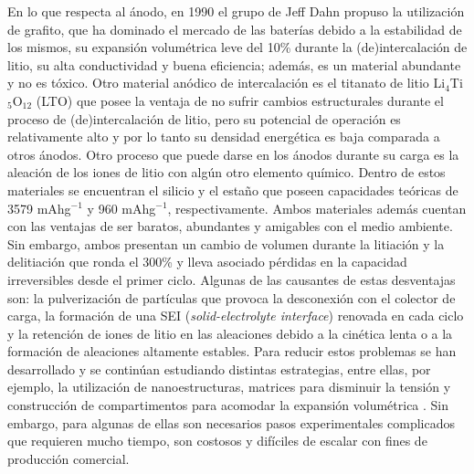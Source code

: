 En lo que respecta al ánodo, en 1990 el grupo de Jeff Dahn \cite{fong1990} propuso 
la utilización de grafito, que ha dominado el mercado de las baterías debido a
la estabilidad de los mismos, su expansión volumétrica leve del 10\% durante 
la (de)intercalación de litio, su alta conductividad y buena eficiencia; además, 
es un material abundante y no es tóxico. Otro material anódico de intercalación 
es el titanato de litio Li$_4$Ti$_5$O$_{12}$ (LTO) que posee la ventaja de 
no sufrir cambios estructurales durante el proceso de (de)intercalación de litio, 
pero su potencial de operación es relativamente alto y por lo tanto su densidad energética es baja comparada a otros ánodos. Otro proceso que
puede darse en los ánodos durante su carga es la aleación de los iones de litio 
con algún otro elemento químico. Dentro de estos materiales se encuentran el silicio y el estaño
que poseen capacidades teóricas de 3579 mAhg$^{-1}$ y 960 mAhg$^{-1}$, 
respectivamente. Ambos materiales además cuentan con las ventajas de ser baratos,
abundantes y amigables con el medio ambiente. Sin embargo, ambos presentan un 
cambio de volumen durante la litiación y la delitiación que ronda el 300\% y 
lleva asociado pérdidas en la capacidad irreversibles desde el primer ciclo.
Algunas de las causantes de estas desventajas son: la pulverización de 
partículas que provoca la desconexión con el colector de carga, la formación de 
una SEI (\textit{solid-electrolyte interface}) renovada en cada ciclo y la 
retención de iones de litio en las aleaciones debido a la cinética lenta o a la
formación de aleaciones altamente estables. Para reducir estos problemas se 
han desarrollado y se continúan estudiando distintas estrategias, entre ellas,
por ejemplo, la utilización de nanoestructuras, matrices para disminuir la 
tensión y construcción de compartimentos para acomodar la expansión 
volumétrica \cite{zuo2016}. Sin embargo, para algunas de ellas son necesarios pasos 
experimentales complicados que requieren mucho tiempo, son costosos y difíciles
de escalar con fines de producción comercial.


